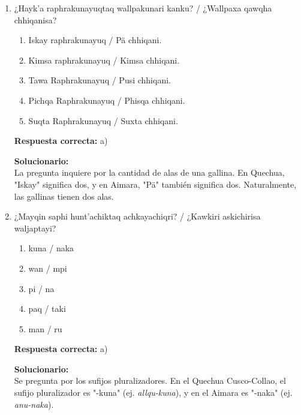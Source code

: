 \begin{enumerate}
	\item ¿Hayk'a raphrakunayuqtaq wallpakunari kanku? / ¿Wallpaxa qawqha chhiqanisa?
	\begin{enumerate}[label=\alph*)]
		\item Iskay raphrakunayuq / Pä chhiqani.
		\item Kimsa raphrakunayuq / Kimsa chhiqani.
		\item Tawa Raphrakunayuq / Pusi chhiqani.
		\item Pichqa Raphrakunayuq / Phisqa chhiqani.
		\item Suqta Raphrakunayuq / Suxta chhiqani.
	\end{enumerate}
	\textbf{Respuesta correcta:} a)
	
	\vspace{2mm}
	\textbf{Solucionario:}\\
	La pregunta inquiere por la cantidad de alas de una gallina. En Quechua, "Iskay" significa dos, y en Aimara, "Pä" también significa dos. Naturalmente, las gallinas tienen dos alas.
	
	\vspace{6mm}
	
	\item ¿Mayqin saphi hunt'achiktaq achkayachiqri? / ¿Kawkiri askichirisa waljaptayi?
	\begin{enumerate}[label=\alph*)]
		\item kuna / naka
		\item wan / mpi
		\item pi / na
		\item paq / taki
		\item man / ru
	\end{enumerate}
	\textbf{Respuesta correcta:} a)
	
	\vspace{2mm}
	\textbf{Solucionario:}\\
	Se pregunta por los sufijos pluralizadores. En el Quechua Cusco-Collao, el sufijo pluralizador es "-kuna" (ej. \textit{allqu-kuna}), y en el Aimara es "-naka" (ej. \textit{anu-naka}).
	
	\vspace{6mm}
\end{enumerate}





